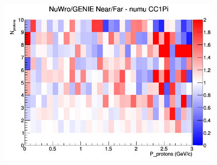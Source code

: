 \begin{figure}[h]
\endminipage
{}
\includegraphics[width=\linewidth]{N_P/nominal/protons/ratios/CC1Pi_NuWro_GENIE_numu_NF_N_P.png}
\endminipage
\newline
\end{figure}
\clearpage
